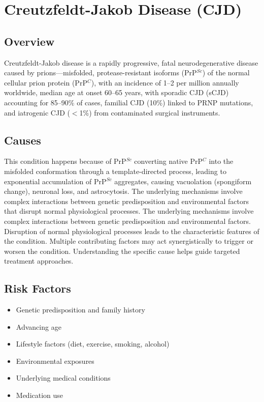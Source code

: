 \chapter{Creutzfeldt-Jakob Disease (CJD)}
\label{sec:Creutzfeldt-Jakob Disease}

\section{Overview}
Creutzfeldt-Jakob disease is a rapidly progressive, fatal neurodegenerative disease caused by prions---misfolded, protease-resistant isoforms (PrP$^{Sc}$) of the normal cellular prion protein (PrP$^{C}$), with an incidence of 1--2 per million annually worldwide, median age at onset 60--65 years, with sporadic CJD (sCJD) accounting for 85--90\% of cases, familial CJD (10\%) linked to PRNP mutations, and iatrogenic CJD ($<$1\%) from contaminated surgical instruments.
\section{Causes}
This condition happens because of PrP$^{Sc}$ converting native PrP$^{C}$ into the misfolded conformation through a template-directed process, leading to exponential accumulation of PrP$^{Sc}$ aggregates, causing vacuolation (spongiform change), neuronal loss, and astrocytosis. The underlying mechanisms involve complex interactions between genetic predisposition and environmental factors that disrupt normal physiological processes. The underlying mechanisms involve complex interactions between genetic predisposition and environmental factors. Disruption of normal physiological processes leads to the characteristic features of the condition. Multiple contributing factors may act synergistically to trigger or worsen the condition. Understanding the specific cause helps guide targeted treatment approaches.
\section{Risk Factors}


\begin{itemize}[noitemsep]
  \item Genetic predisposition and family history
  \item Advancing age
  \item Lifestyle factors (diet, exercise, smoking, alcohol)
  \item Environmental exposures
  \item Underlying medical conditions
  \item Medication use
\end{itemize}
